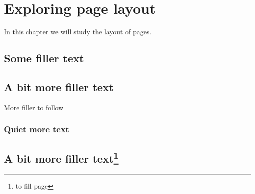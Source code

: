 \documentclass[a4paper,12pt, inner=1.5cm, outer=3cm,top=2cm, bottom=3cm, bindingoffset=1cm]{book}
\begin{document}
\chapter{Exploring page layout}
In this chapter we will study the layout of pages.
\section{Some filler text}
\blindtext
\section{A bit more filler text}
More filler to follow
\subsection{Quiet more text}
\blindtext[10]
\section{A bit more filler text\protect\footnote{to fill page}}
\end{document}
